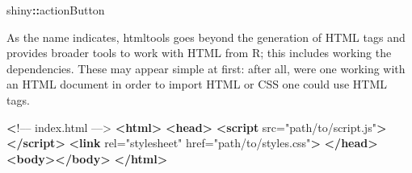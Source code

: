\documentclass[10pt,]{krantz}
\makeatletter
\newenvironment{Shaded}{\begin{snugshade}}{\end{snugshade}}
\newcommand{\ControlFlowTok}[1]{\textcolor[rgb]{0.27,0.27,0.27}{\textbf{#1}}}
\newcommand{\DataTypeTok}[1]{\textcolor[rgb]{0.27,0.27,0.27}{#1}}
\newcommand{\ErrorTok}[1]{\textcolor[rgb]{0.14,0.14,0.14}{\textbf{#1}}}
\newcommand{\KeywordTok}[1]{\textcolor[rgb]{0.27,0.27,0.27}{\textbf{#1}}}
\newcommand{\NormalTok}[1]{#1}
\newcommand{\OperatorTok}[1]{\textcolor[rgb]{0.43,0.43,0.43}{\textbf{#1}}}
\newcommand{\OtherTok}[1]{\textcolor[rgb]{0.37,0.37,0.37}{#1}}
\newcommand{\StringTok}[1]{\textcolor[rgb]{0.5,0.5,0.5}{#1}}
\newenvironment{kframe}{%
\medskip{}
\setlength{\fboxsep}{.8em}
 \def\at@end@of@kframe{}%
 \ifinner\ifhmode%
  \def\at@end@of@kframe{\end{minipage}}%
  \begin{minipage}{\columnwidth}%
 \fi\fi%
 \def\FrameCommand##1{\hskip\@totalleftmargin \hskip-\fboxsep
 \colorbox{shadecolor}{##1}\hskip-\fboxsep
     \hskip-\linewidth \hskip-\@totalleftmargin \hskip\columnwidth}%
 \MakeFramed {\advance\hsize-\width
   \@totalleftmargin\z@ \linewidth\hsize
   \@setminipage}}%
 {\par\unskip\endMakeFramed%
 \at@end@of@kframe}
\renewenvironment{Shaded}{\begin{kframe}}{\end{kframe}}
\makeatother
\begin{document}
\begin{Shaded}
\begin{Highlighting}[]
\NormalTok{shiny}\OperatorTok{::}\NormalTok{actionButton}
\end{Highlighting}
\end{Shaded}

\begin{Shaded}
\end{Shaded}

As the name indicates, htmltools goes beyond the generation of HTML tags and provides broader tools to work with HTML from R; this includes working the dependencies. These may appear simple at first: after all, were one working with an HTML document in order to import HTML or CSS one could use HTML tags.

\begin{Shaded}
\begin{Highlighting}[]
 \ErrorTok{<}\NormalTok{!–– index.html ––>}
\KeywordTok{<html>}
  \KeywordTok{<head>}
    \KeywordTok{<script}\OtherTok{ src=}\StringTok{"path/to/script.js"}\KeywordTok{></script>}
    \KeywordTok{<link}\OtherTok{ rel=}\StringTok{"stylesheet"}\OtherTok{ href=}\StringTok{"path/to/styles.css"}\KeywordTok{>}
  \KeywordTok{</head>}
  \KeywordTok{<body></body>}
\KeywordTok{</html>}
\end{Highlighting}
\end{Shaded}
\end{document}
